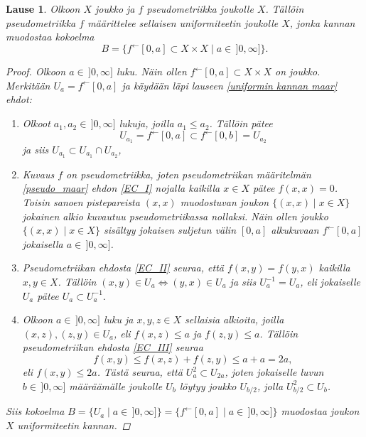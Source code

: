 \documentclass[12pt,a4paper,leqno]{report}
\theoremstyle{plain}
\newtheorem{lause}[equation]{Lause}
\theoremstyle{definition}
\theoremstyle{remark}
\begin{document}
\begin{lause}\label{pseudo_uniformi_maar}
Olkoon $X$ joukko ja $f$ pseudometriikka joukolle $X$. Tällöin pseudometriikka $f$ määrittelee sellaisen uniformiteetin joukolle $X$, jonka kannan muodostaa kokoelma $$B=\{ f^{\leftarrow}[0,a]\subset X\times X\mid a\in\,]0,\infty]\}.$$
\begin{proof}
Olkoon $a\in\,]0,\infty]$ luku. 
Näin ollen $f^{\leftarrow}[0,a]\subset X\times X$ on joukko. 
Merkitään $U_a=f^{\leftarrow}[0,a]$ ja 
käydään läpi lauseen \ref{uniformin kannan maar} ehdot:
\begin{enumerate} [label=(B\arabic*)]
\item %
Olkoot $a_1,a_2\in\,]0,\infty]$ lukuja, joilla $a_1\leq a_2$. 
Tällöin pätee $$U_{a_1}=f^{\leftarrow}[0,a]\subset f^{\leftarrow}[0,b]=U_{a_2}$$ ja siis $U_{a_1}\subset U_{a_1}\cap U_{a_2}$,
\item%
Kuvaus $f$ on pseudometriikka, joten pseudometriikan määritelmän \ref{pseudo_maar} ehdon \ref{EC_I} nojalla kaikilla $x\in X$ pätee $f(x,x)=0$. 
Toisin sanoen pistepareista $(x,x)$ muodostuvan joukon $\{(x,x)\mid x\in X\}$ jokainen alkio kuvautuu pseudometriikassa nollaksi. Näin ollen joukko $\{(x,x)\mid x\in X\}$ sisältyy jokaisen suljetun välin $[0,a]$ alkukuvaan $f^{\leftarrow}[0,a]$ jokaisella $a\in \,]0,\infty]$.
\item%
Pseudometriikan ehdosta \ref{EC_II} seuraa, että $f(x,y)=f(y,x)$ kaikilla $x,y\in X$. 
Tällöin $(x,y)\in U_a\Leftrightarrow (y,x)\in U_a$ ja siis $U_a^{-1}=U_a$, eli jokaiselle $U_a$ pätee $U_a\subset U_a^{-1}. $
\item%
Olkoon $a\in\,]0,\infty]$ luku ja $x,y,z\in X$ sellaisia alkioita, 
joilla $(x,z),(z,y)\in U_a$, 
eli $f(x,z)\leq a$ ja $f(z,y)\leq a$.
Tällöin pseudometriikan ehdosta \ref{EC_III} seuraa 
$$f(x,y)\leq f(x,z)+f(z,y)\leq a+a=2a,$$ 
eli $f(x,y)\leq 2a$. Tästä seuraa, että $U_a^2\subset U_{2a} $, joten jokaiselle luvun $b\in\,]0,\infty]$ määräämälle joukolle $U_b$ löytyy joukko $U_{b/2}$, jolla $U_{b/2}^2\subset U_b$.
\end{enumerate}
Siis kokoelma $B=\{U_a\mid a\in\,]0,\infty]\}
=\{f^{\leftarrow}[0,a]\mid a\in\,]0,\infty]\}
$ muodostaa joukon $X$ uniformiteetin kannan.
\end{proof}
\end{lause}
\end{document}
